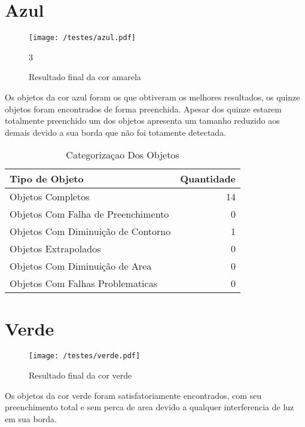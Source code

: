 \section{Azul}
	\begin{figure}[H]
		\centering
		\texttt{[image: /testes/azul.pdf]}
		\caption{Resultado final da cor amarela}
		\label{disposicaoparte}3
	\end{figure}

Os objetos da cor azul foram os que obtiveram os melhores resultados, os quinze objetos foram encontrados de forma preenchida.	Apesar dos quinze estarem totalmente preenchido um dos objetos apresenta um tamanho reduzido aos demais devido a sua borda que não foi totamente detectada.

\begin{table}[h]
\centering
\begin{tabular}{l|r}
Tipo de Objeto & Quantidade \\ %
\hline                               %
Objetos Completos & 14 \\
\hline 
Objetos Com Falha de Preenchimento & 0\\
\hline 
Objetos Com Diminuição de Contorno &  1\\
\hline 
Objetos Extrapolados &  0\\
\hline 
Objetos Com Diminuição de Area & 0 \\
\hline 
Objetos Com Falhas Problematicas & 0 \\
\hline 
\end{tabular}
\caption{Categorizaçao Dos Objetos}
\end{table}

\section{Verde}
	\begin{figure}[H]
		\centering
		\texttt{[image: /testes/verde.pdf]}
		\caption{Resultado final da cor verde}
		\label{disposicaoparte}
	\end{figure}

Os objetos da cor verde foram satisfatoriamente encontrados, com seu preenchimento total e sem perca de area devido a qualquer interferencia de luz em sua borda.	
	

